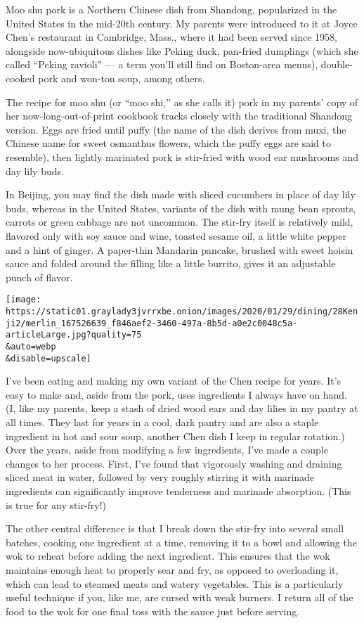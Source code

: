 Moo shu pork is a Northern Chinese dish from Shandong, popularized in
the United States in the mid-20th century. My parents were introduced to
it at Joyce Chen's restaurant in Cambridge, Mass., where it had been
served since 1958, alongside now-ubiquitous dishes like Peking duck,
pan-fried dumplings (which she called ``Peking ravioli'' --- a term
you'll still find on Boston-area menus), double-cooked pork and won-ton
soup, among others.

The recipe for moo shu (or ``moo shi,'' as she calls it) pork in my
parents' copy of her now-long-out-of-print cookbook tracks closely with
the traditional Shandong version. Eggs are fried until puffy (the name
of the dish derives from muxi, the Chinese name for sweet osmanthus
flowers, which the puffy eggs are said to resemble), then lightly
marinated pork is stir-fried with wood ear mushrooms and day lily buds.

In Beijing, you may find the dish made with sliced cucumbers in place of
day lily buds, whereas in the United States, variants of the dish with
mung bean sprouts, carrots or green cabbage are not uncommon. The
stir-fry itself is relatively mild, flavored only with soy sauce and
wine, toasted sesame oil, a little white pepper and a hint of ginger. A
paper-thin Mandarin pancake, brushed with sweet hoisin sauce and folded
around the filling like a little burrito, gives it an adjustable punch
of flavor.

\texttt{[image: https://static01.graylady3jvrrxbe.onion/images/2020/01/29/dining/28Kenji2/merlin\_167526639\_f846aef2-3460-497a-8b5d-a0e2c0048c5a-articleLarge.jpg?quality=75\\\&auto=webp\\\&disable=upscale]}

I've been eating and making my own variant of the Chen recipe for years.
It's easy to make and, aside from the pork, uses ingredients I always
have on hand. (I, like my parents, keep a stash of dried wood ears and
day lilies in my pantry at all times. They last for years in a cool,
dark pantry and are also a staple ingredient in hot and sour soup,
another Chen dish I keep in regular rotation.) Over the years, aside
from modifying a few ingredients, I've made a couple changes to her
process. First, I've found that vigorously washing and draining sliced
meat in water, followed by very roughly stirring it with marinade
ingredients can significantly improve tenderness and marinade
absorption. (This is true for any stir-fry!)

The other central difference is that I break down the stir-fry into
several small batches, cooking one ingredient at a time, removing it to
a bowl and allowing the wok to reheat before adding the next ingredient.
This ensures that the wok maintains enough heat to properly sear and
fry, as opposed to overloading it, which can lead to steamed meats and
watery vegetables. This is a particularly useful technique if you, like
me, are cursed with weak burners. I return all of the food to the wok
for one final toss with the sauce just before serving.

